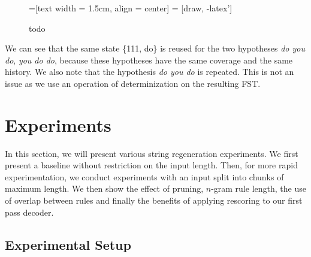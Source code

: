 \begin{figure}
  \scriptsize
  =[text width = 1.5cm, align = center]
   = [draw, -latex']

  \begin{center}
  \end{center}
  \caption{todo}
  \label{fig:exampleAlgoGyro}
\end{figure}
%
We can see that the same state \{111, do\} is reused for
the two hypotheses \emph{do you do}, \emph{you do do}, because
these hypotheses have the same coverage and the same history.
We also note that the hypothesis \emph{do you do} is repeated.
This is not an issue as we use an operation of determinization
on the resulting FST.

\section{Experiments}

In this section, we will present various
string regeneration experiments.  We first present
a baseline without restriction on the input length.
Then, for more rapid experimentation, we conduct
experiments with an input split into chunks of maximum length.
We then show the effect of pruning, $n$-gram rule
length, the use of overlap between rules and finally
the benefits of applying rescoring to our first
pass decoder.

\subsection{Experimental Setup}

